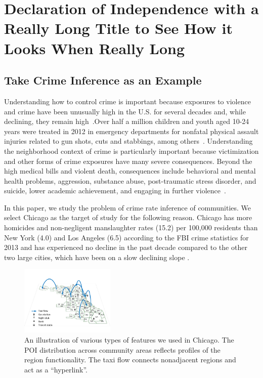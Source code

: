 \vspace*{-80mm}
\chapter{Declaration of Independence with a Really Long Title to See How it Looks When Really Long} \label{chapter1:introduction}




\section{Take Crime Inference as an Example}

Understanding how to control crime is important because exposures to violence and crime have been unusually high in the U.S. for several decades and, while declining, they remain high~\cite{Baum05, Fink08}.Over half a million children and youth aged 10-24 years were treated in 2012 in emergency departments for nonfatal physical assault injuries related to gun shots, cuts and stabbings, among others~\cite{cdc15}.  Understanding the neighborhood context of crime is particularly important because victimization and other forms of crime exposures have many severe consequences.  Beyond the high medical bills and violent death, consequences include behavioral and mental health problems, aggression, substance abuse, post-traumatic stress disorder, and suicide, lower academic achievement, and engaging in further violence~\cite{Grai15}. 

In this paper, we study the problem of crime rate inference of communities. We select Chicago as the target of study for the following reason. Chicago has more homicides and non-negligent manslaughter rates (15.2)
per 100,000 residents than New York (4.0) and Los Angeles (6.5)
according to the FBI crime statistics for 2013 and has experienced no
decline in the past decade compared to the other two large cities,
which have been on a slow declining slope \cite{crime-stats}.


\begin{figure}[t]
\centering
\includegraphics[width=0.4\textwidth]{fig/demo.pdf}
\caption{An illustration of various types of features we used in Chicago. The POI distribution across community areas reflects profiles of the region functionality. The taxi flow connects nonadjacent regions and act as a ``hyperlink''.}
\label{fig:demo}
\end{figure}

